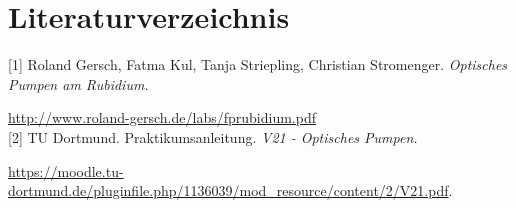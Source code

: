 \section{Literaturverzeichnis}

[1] Roland Gersch, Fatma Kul, Tanja Striepling, Christian Stromenger. \textit{Optisches Pumpen am Rubidium.}

\url{http://www.roland-gersch.de/labs/fprubidium.pdf} \\

[2] TU Dortmund. Praktikumsanleitung. \textit{V21 - Optisches Pumpen.}

\url{https://moodle.tu-dortmund.de/pluginfile.php/1136039/mod_resource/content/2/V21.pdf}.

